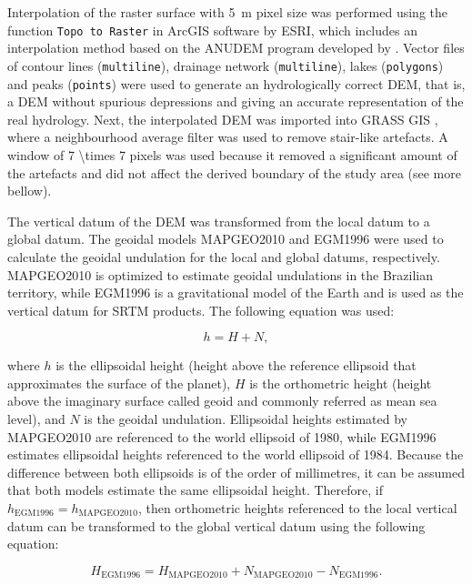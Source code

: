 Interpolation of the raster surface with \SI{5}{\metre} pixel size was performed using the function 
\texttt{Topo to Raster} in ArcGIS\textregistered{} software by ESRI, which includes an interpolation 
method based on the ANUDEM program developed by . Vector files of contour 
lines (\texttt{multiline}), drainage network (\texttt{multiline}), lakes (\texttt{polygons}) and 
peaks (\texttt{points}) were used to generate an hydrologically correct DEM, that is, a DEM without 
spurious depressions and giving an accurate representation of the real hydrology. Next, the 
interpolated DEM was imported into GRASS GIS \cite{GRASS2012}, where a neighbourhood average filter 
was used to remove stair-like artefacts. A window of \num{7 \times 7} pixels was used because it 
removed a significant amount of the artefacts and did not affect the derived boundary of the study 
area (see more bellow).

The vertical datum of the DEM was transformed from the local datum to a global datum. The geoidal 
models MAPGEO2010 \cite{IBGE2010a} and EGM1996 \cite{LemoineEtAl1998} were used to calculate the 
geoidal undulation for the local and global datums, respectively. MAPGEO2010 is optimized to 
estimate geoidal undulations in the Brazilian territory, while EGM1996 is a gravitational model of 
the Earth and is used as the vertical datum for SRTM products. The following equation was used:

\begin{equation}
 h = H + N,
\end{equation}

\noindent where $h$ is the ellipsoidal height (height above the reference ellipsoid that 
approximates the surface of the planet), $H$ is the orthometric height (height above the imaginary 
surface called geoid and commonly referred as mean sea level), and $N$ is the geoidal undulation. 
Ellipsoidal heights estimated by MAPGEO2010 are referenced to the world ellipsoid of 1980, while 
EGM1996 estimates ellipsoidal heights referenced to the world ellipsoid of 1984. Because the 
difference between both ellipsoids is of the order of millimetres, it can be assumed that both 
models estimate the same ellipsoidal height. Therefore, if 
$h_{\text{EGM1996}} = h_{\text{MAPGEO2010}}$, then orthometric heights referenced to the local 
vertical datum can be transformed to the global vertical datum using the following equation:

\begin{equation}\label{eq:geoidal}
 H_{\text{EGM1996}} = H_{\text{MAPGEO2010}} + N_{\text{MAPGEO2010}} - N_{\text{EGM1996}}.
\end{equation}

